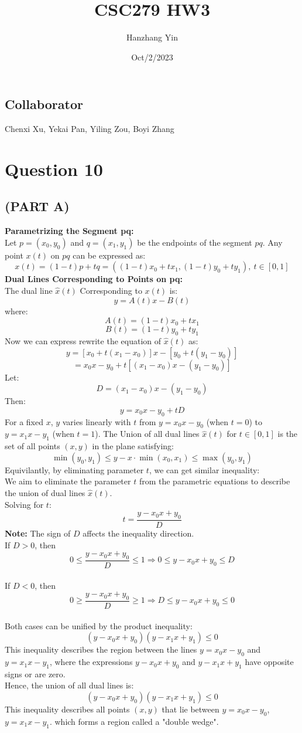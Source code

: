 \documentclass{article}
\title{CSC279 HW3}
\author{Hanzhang Yin}
\date{Oct/2/2023}
\begin{document}
\maketitle

\subsection*{Collaborator}
Chenxi Xu, Yekai Pan, Yiling Zou, Boyi Zhang

\section*{Question 10}

\subsection*{(PART A)}
\textbf{Parametrizing the Segment pq: }
\\
Let $p = (x_0, y_0)$ and $q = (x_1, y_1)$ be the endpoints of the segment $pq$. Any point $x(t)$ on $pq$ can 
be expressed as: 
\[ x(t) = (1 - t)p + tq = ((1 - t)x_0 + tx_1, (1 - t)y_0 + ty_1), \ t \in [0, 1] \]
\textbf{Dual Lines Corresponding to Points on pq: }
\\
The dual line $\hat{x}(t)$ Corresponding to $x(t)$ is:
\[ y = A(t)x - B(t) \]
where:
\[ A(t) = (1 - t)x_0 + tx_1 \]
\[ B(t) = (1 - t)y_0 + ty_1 \]
Now we can express rewrite the equation of $\hat{x}(t)$ as:
\[ y = [x_0 + t(x_1 - x_0)]x - [y_0 + t(y_1 - y_0)] \]
\[ = x_0x - y_0 + t[(x_1 - x_0)x - (y_1 - y_0)] \]
Let:
\[ D = (x_1 - x_0)x - (y_1 - y_0) \]
Then:
\[ y = x_0x - y_0 + tD \]
For a fixed $x$, $y$ varies linearly with $t$ from $y = x_0x - y_0$ (when $t = 0$) to $y = x_1x - y_1$ (when $t = 1$).
The Union of all dual lines $\hat{x}(t)$ for $t \in [0,1]$ is the set of all points $(x, y)$ in the plane satisfying:
\[ \min(y_0, y_1) \leq y - x \cdot \min(x_0, x_1) \leq \max(y_0, y_1) \]
Equivilantly, by eliminating parameter $t$, we can get similar inequality:
\\
We aim to eliminate the parameter \( t \) from the parametric equations to describe the union of dual lines \(\hat{x}(t)\).
\\
Solving for \( t \):
\[
t = \frac{y - x_0 x + y_0}{D}
\]
\textbf{Note:} The sign of \( D \) affects the inequality direction.
\\
If \( D > 0 \), then
\[ 0 \leq \frac{y - x_0 x + y_0}{D} \leq 1 \Rightarrow 0 \leq y - x_0 x + y_0 \leq D \]
\\
If \( D < 0 \), then
\[ 0 \geq \frac{y - x_0 x + y_0}{D} \geq 1 \Rightarrow D \leq y - x_0 x + y_0 \leq 0 \]
\\
Both cases can be unified by the product inequality:
\[ (y - x_0 x + y_0)(y - x_1 x + y_1) \leq 0 \]
This inequality describes the region between the lines \( y = x_0 x - y_0 \) and \( y = x_1 x - y_1 \), where the expressions \( y - x_0 x + y_0 \) and \( y - x_1 x + y_1 \) have opposite signs or are zero.
\\
Hence, the union of all dual lines is:
\[ (y - x_0 x + y_0)(y - x_1 x + y_1) \leq 0 \]
This inequality describes all points $(x, y)$ that lie between $y = x_0x - y_0$, $y = x_1x - y_1$. 
which forms a region called a "double wedge".
\end{document}
